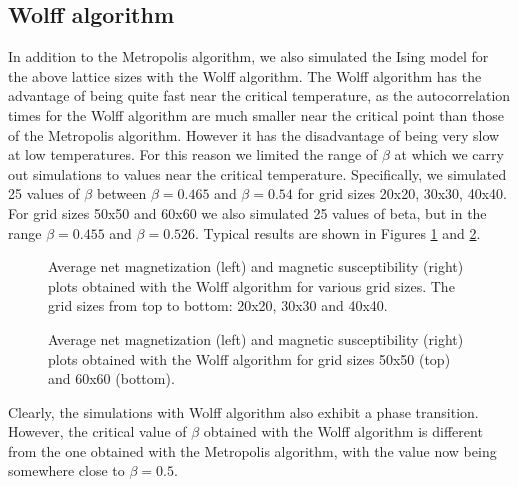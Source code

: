 \documentclass[11pt,a4paper]{article}
\begin{document}

 

\subsection{Wolff algorithm}

In addition to the Metropolis algorithm, we also simulated the Ising model for the above lattice sizes with the Wolff algorithm. The 
 Wolff algorithm has the advantage of being quite fast near the critical temperature, as the autocorrelation times for the Wolff
 algorithm are much smaller near the critical point than those of the Metropolis algorithm. However it has the disadvantage of being
 very slow at low temperatures. For this reason we limited the range of $\beta$ at which we carry out simulations to values near
 the critical temperature. Specifically, we simulated 25 values of $\beta$ between $\beta = 0.465$ and $\beta = 0.54$ for grid sizes
 20x20, 30x30, 40x40. For grid sizes 50x50 and 60x60 we also simulated 25 values of beta, but in the 
 range $\beta = 0.455$ and $\beta = 0.526$.
 Typical results are shown in Figures \ref{fig:wolff_first} and \ref{fig:wolff_last}.

\begin{figure}[H]

  \caption{Average net magnetization (left) and magnetic susceptibility (right) plots obtained with the 
    Wolff algorithm for various grid sizes. The grid sizes from top to bottom: 20x20, 30x30 and 40x40.}

\label{fig:wolff_first}
\end{figure}


\begin{figure}[H]

  \caption{Average net magnetization (left) and magnetic susceptibility (right) plots obtained with the 
    Wolff algorithm for grid sizes 50x50 (top) and 60x60 (bottom).}

\label{fig:wolff_last}
\end{figure}

Clearly, the simulations with Wolff algorithm also exhibit a phase transition. However, the critical value of $\beta$ 
 obtained with the Wolff algorithm is different from the one obtained with the Metropolis algorithm, with the value now
 being somewhere close to $\beta = 0.5$.
\end{document}
